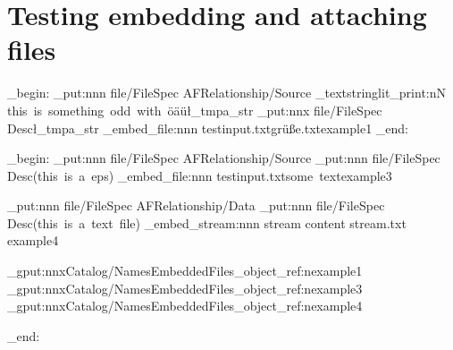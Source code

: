 \documentclass{article}
\begin{document}
\section{Testing embedding and attaching files}
\ExplSyntaxOn
\group_begin:
\pdfdict_put:nnn  {file/FileSpec} {AFRelationship}{/Source}
\pdftool_textstringlit_print:nN {this~is~something~odd~with~öäü}\l_tmpa_str
\pdfdict_put:nnx  {file/FileSpec} {Desc}{\l_tmpa_str}
\pdffile_embed_file:nnn {testinput.txt}{grüße.txt}{example1}
\group_end:



\group_begin:
\pdfdict_put:nnn  {file/FileSpec} {AFRelationship}{/Source}
\pdfdict_put:nnn  {file/FileSpec} {Desc}{(this~is~a~eps)}
\pdffile_embed_file:nnn {testinput.txt}{some~text}{example3}

\pdfdict_put:nnn  {file/FileSpec} {AFRelationship}{/Data}
\pdfdict_put:nnn  {file/FileSpec} {Desc}{(this~is~a~text~file)}
\pdffile_embed_stream:nnn {stream content} {stream.txt} {example4}



\pdfcoredict_gput:nnx{Catalog/Names}{EmbeddedFiles}{\pdf_object_ref:n{example1}}
\pdfcoredict_gput:nnx{Catalog/Names}{EmbeddedFiles}{\pdf_object_ref:n{example3}}
\pdfcoredict_gput:nnx{Catalog/Names}{EmbeddedFiles}{\pdf_object_ref:n{example4}}

\group_end:
\end{document}
